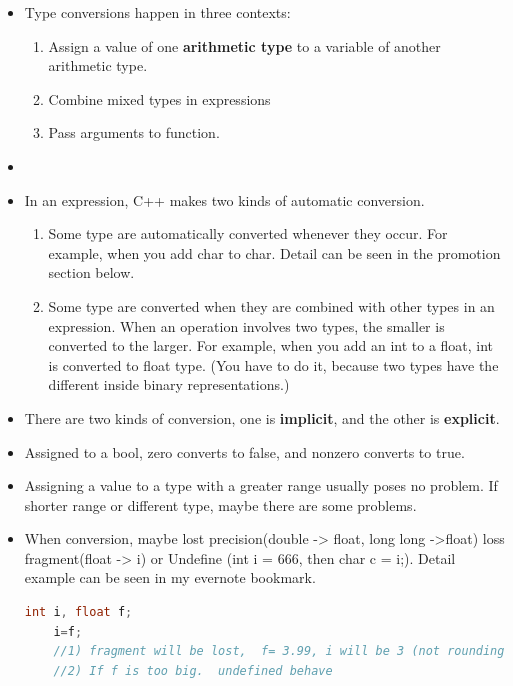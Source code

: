 \documentclass[a4paper,12pt,twoside]{book}
\begin{document}
\begin{itemize}
	\item Type conversions happen in three contexts:
	\begin{enumerate}
		\item Assign a value of one \textbf{arithmetic type} to a variable of another arithmetic type.
		\item Combine mixed types in expressions
		\item Pass arguments to function.
	\end{enumerate}
	
	\item
	
	
	\item In an expression, C++ makes two kinds of automatic conversion.
	\begin{enumerate}
		\item Some type are automatically converted whenever they occur. For example, when you add char to char. Detail can be seen in the promotion section below.
		
		\item Some type are converted when they are combined with other types in an expression. When an operation involves two types, the smaller is converted to the larger. For example, when you add an int to a float, int is converted to float type. (You have to do it, because two types have the different inside binary representations.)
	\end{enumerate}
	
	\item There are two kinds of conversion, one is \textbf{implicit}, and the other is \textbf{explicit}.
	
	\item Assigned to a bool, zero converts to false, and nonzero converts to true.
	
	\item Assigning a value to a type with a greater range usually poses no problem. If shorter range or different type, maybe there are some problems.
	
	\item When conversion, maybe lost precision(double -> float, long long ->float) loss fragment(float -> i) or Undefine (int i = 666, then char c = i;). Detail example can be seen in my evernote bookmark.
	
	\begin{lstlisting}[frame=single, language=c++]
	int i, float f;
	i=f;
	//1) fragment will be lost,  f= 3.99, i will be 3 (not rounding)
	//2) If f is too big.  undefined behave
	

\end{lstlisting}
\end{itemize}
\end{document}
